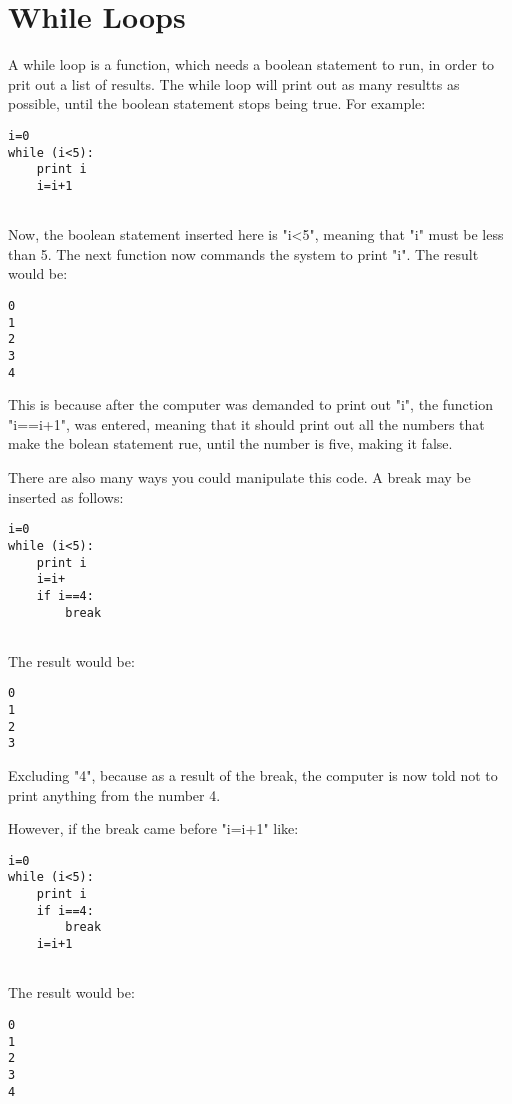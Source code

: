 \chapter{While Loops}
A while loop is a function, which needs a boolean statement to run, in order to prit out a list of results. The while loop will print out as many resultts as possible, until the boolean statement stops being true. For example:

\begin{verbatim}
i=0
while (i<5):
    print i
    i=i+1
    
\end{verbatim}

Now, the boolean statement inserted here is "i<5", meaning that "i" must be less than 5. The next function now commands the system to print "i". The result would be:
\begin{verbatim}
0
1
2
3
4
\end{verbatim}

This is because after the computer was demanded to print out "i", the function "i==i+1", was entered, meaning that it should print out all the numbers that make the bolean statement rue, until the number is five, making it false.

There are also many ways you could manipulate this code. A break may be inserted as follows: 
\begin{verbatim}
i=0
while (i<5):
    print i
    i=i+
    if i==4:
        break
    
\end{verbatim}

The result would be:
\begin{verbatim}
0
1
2
3
\end{verbatim}

Excluding "4", because as a result of the break, the computer is now told not to print anything from the number 4.

However, if the break came before "i=i+1" like:
\begin{verbatim}
i=0
while (i<5):
    print i
    if i==4:
        break
    i=i+1
    
\end{verbatim}

The result would be:
\begin{verbatim}
0
1
2
3
4
\end{verbatim}












